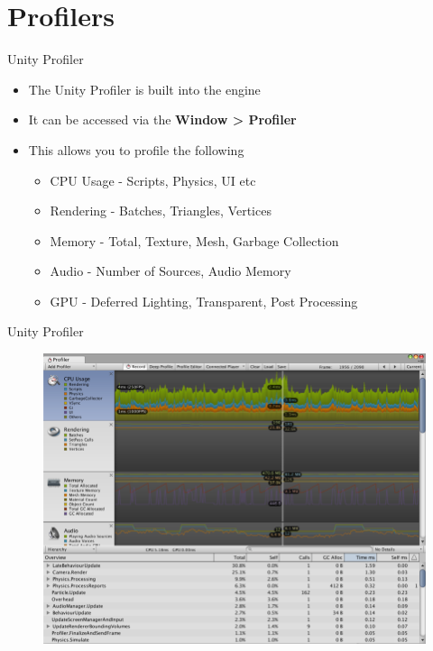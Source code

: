 \part{Profilers}
\frame{\partpage}

\begin{frame}{Unity Profiler}
	\begin{itemize}
		\pause \item The Unity Profiler is built into the engine
		\pause \item It can be accessed via the \textbf{ Window > Profiler}
		\pause \item This allows you to profile the following
		\begin{itemize}
			\pause \item CPU Usage - Scripts, Physics, UI etc
			\pause \item Rendering - Batches, Triangles, Vertices
			\pause \item Memory - Total, Texture, Mesh, Garbage Collection
			\pause \item Audio - Number of Sources, Audio Memory
			\pause \item GPU - Deferred Lighting, Transparent, Post Processing
		\end{itemize} 
	\end{itemize}
\end{frame}

\begin{frame}{Unity Profiler}
	\begin{figure}
		\includegraphics[width=1.0\textwidth,height=0.8\textheight]{UnityProfilerWindow}  
	\end{figure}
\end{frame}

